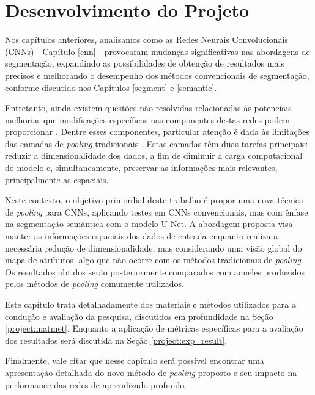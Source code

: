 \newpage
\clearpage

\section{Desenvolvimento do Projeto}
\label{project}

Nos capítulos anteriores, analisamos como as Redes Neurais Convolucionais (CNNs) - Capítulo \ref{cnn} - provocaram mudanças significativas nas abordagens de segmentação, expandindo as possibilidades de obtenção de resultados mais precisos e melhorando o desempenho dos métodos convencionais de segmentação, conforme discutido nos Capítulos \ref{segment} e \ref{semantic}.

Entretanto, ainda existem questões não resolvidas relacionadas às potenciais melhorias que modificações específicas nas componentes destas redes podem proporcionar \citep{AsgariTaghanaki2021DeepReview}. Dentre esses componentes, particular atenção é dada às limitações das camadas de \textit{pooling} tradicionais \citep{Liu2019Multi-LevelNetworks, He2015SpatialRecognition}. Estas camadas têm duas tarefas principais: reduzir a dimensionalidade dos dados, a fim de diminuir a carga computacional do modelo e, simultaneamente, preservar as informações mais relevantes, principalmente as espaciais.

Neste contexto, o objetivo primordial deste trabalho é propor uma nova técnica de \textit{pooling} para CNNs, aplicando testes em CNNs convencionais, mas com ênfase na segmentação semântica com o modelo U-Net. A abordagem proposta visa manter as informações espaciais dos dados de entrada enquanto realiza a necessária redução de dimensionalidade, mas considerando uma visão global do mapa de atributos, algo que não ocorre com os métodos tradicionais de \textit{pooling}. Os resultados obtidos serão posteriormente comparados com aqueles produzidos pelos métodos de \textit{pooling} comumente utilizados.

Este capítulo trata detalhadamente dos materiais e métodos utilizados para a condução e avaliação da pesquisa, discutidos em profundidade na Seção \ref{project:matmet}. Enquanto a aplicação de métricas específicas para a avaliação dos resultados será discutida na Seção \ref{project:exp_result}.

Finalmente, vale citar que nesse capítulo será possível encontrar uma apresentação detalhada do novo método de \textit{pooling} proposto e seu impacto na performance das redes de aprendizado profundo.


